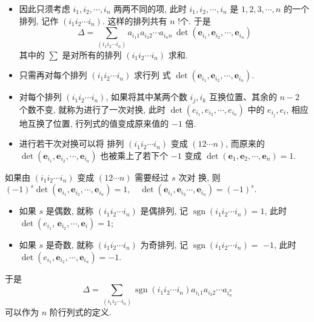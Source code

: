 \documentclass[10pt,punct]{ctexbeamer}
\begin{document}
\begin{frame}
    \begin{itemize}
        \item   因此只须考虑 $i_1, i_2, \cdots, i_n$ 两两不同的项, 此时 $i_1, i_2, \cdots, i_n$ 是 $1,2,3, \cdots, n$ 的一个排列, 记作 $\left(i_1 i_2 \cdots i_n\right)$. 这样的排列共有 $n$ !个. 于是
        $$
        \Delta=\sum_{\left(i_1 i_2 \cdots i_n\right)} a_{i_1 1} a_{i_2  2} \cdots a_{i_n n} \, \operatorname{det}\left(\boldsymbol{e}_{i_1}, \boldsymbol{e}_{i_2}, \cdots, \boldsymbol{e}_{i_n}\right)
        $$
        其中的 $\sum$ 是对所有的排列 $\left(i_1 i_2 \cdots i_n\right)$ 求和.
        \item   只需再对每个排列 $\left(i_1 i_2 \cdots i_n\right)$ 求行列 式 $\operatorname{det}\left(\boldsymbol{e}_{i_1}, \boldsymbol{e}_{i_2}, \cdots, \boldsymbol{e}_{i_n}\right)$.

        \pause
        \item
        对每个排列 $\left(i_1 i_2 \cdots i_n\right)$, 如果将其中某两个数 $i_j, i_k$ 互换位置、其余的 $n-2$ 个数不变, 就称为进行了一次\alert{对换}, 此时 $\operatorname{det}\left(e_{i_1}, e_{i_2}, \cdots, e_{i_n}\right)$ 中的 $e_{i_j}, e_i$, 相应地互换了位置, 行列式的值变成原来值的 $-1$ 倍.

        \item
        进行若干次对换可以将
        排列 $\left(i_1 i_2 \cdots i_n\right)$ 变成 $(12 \cdots n)$, 而原来的 $\operatorname{det}\left(\boldsymbol{e}_{i_1}, \boldsymbol{e}_{i_2}, \cdots, \boldsymbol{e}_{i_n}\right)$ 也被乘上了若下个 $-1$ 变成 $\operatorname{det}\left(\boldsymbol{e}_1, \boldsymbol{e}_2, \cdots, \boldsymbol{e}_n\right)=1$.

    \end{itemize}
\end{frame}

\begin{frame}


    如果由 $\left(i_1 i_2 \cdots i_n\right)$ 变成 $(12 \cdots n)$ 需要经过 $s$ 次{对 换}, 则
    $
    (-1)^s \operatorname{det}\left(\boldsymbol{e}_{i_1}, \boldsymbol{e}_{i_2}, \cdots, \boldsymbol{e}_{i_n}\right)=1, \quad \operatorname{det}\left(\boldsymbol{e}_{i_1}, \boldsymbol{e}_{i_2} \cdots, \boldsymbol{e}_{i_n}\right)=(-1)^s.
    $
    \begin{itemize}
        \item 如果 $s$ 是偶数, 就称 $\left(i_1 i_2 \cdots i_n\right)$ 是偶排列, 记 $\operatorname{sgn} \left(i_1 i_2 \cdots i_n\right)=1$, 此时 $\operatorname{det}\left(e_{i_1}\right.$, $\left.\boldsymbol{e}_{i_2}, \cdots, \boldsymbol{e}_i\right)=1$;
        \item 如果 $s$ 是奇数, 就称 $\left(i_1 i_2 \cdots i_n\right)$ 为奇排列, 记 $\operatorname{sgn}\left(i_1 i_2 \cdots i_n\right)=$ $-1$, 此时 $\operatorname{det}\left(e_{i_1}, \boldsymbol{e}_{i_2}, \cdots, \boldsymbol{e}_{i_n}\right)=-1$.
    \end{itemize}

    于是 $$\Delta=\sum_{ \left(i_1 i_2 \cdots i_n\right)}  \operatorname{sgn}  \left(i_1 i_2 \cdots i_n\right) a_{i_1 1} a_{i_2 2} \cdots a_{i_n^n}$$ 可以作为 $n$ 阶行列式的定义.
\end{frame}
\end{document}
